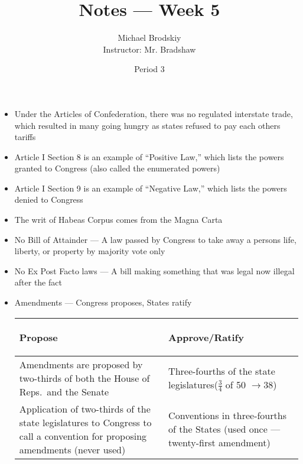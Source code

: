 \documentclass[12pt]{article}
\title{Notes — Week 5}
\date{Period 3}
\author{Michael Brodskiy\\ \small Instructor: Mr. Bradshaw}
\begin{document}
\maketitle

\begin{itemize}

  \item Under the Articles of Confederation, there was no regulated interstate trade, which resulted in many going hungry as states refused to pay each others tariffs

  \item Article I Section 8 is an example of “Positive Law,” which lists the powers granted to Congress (also called the enumerated powers)

  \item Article I Section 9 is an example of “Negative Law,” which lists the powers denied to Congress

  \item The writ of Habeas Corpus comes from the Magna Carta

  \item No Bill of Attainder — A law passed by Congress to take away a persons life, liberty, or property by majority vote only

  \item No Ex Post Facto laws — A bill making something that was legal now illegal after the fact


  \item Amendments — Congress proposes, States ratify

    \begin{center}
      \begin{tabular}{|p{}|p{}|}
        \hline
        \begin{center}Propose\end{center} & \begin{center}Approve/Ratify\end{center}\\
        \hline
        Amendments are proposed by two-thirds of both the House of Reps.\ and the Senate & Three-fourths of the state legislatures\newline ($\frac{3}{4}$ of 50 $\rightarrow 38$)\\
        \hline
        Application of two-thirds of the state legislatures to Congress to call a convention for proposing amendments (never used) & Conventions in three-fourths of the States (used once — twenty-first amendment)\\
        \hline
      \end{tabular}
    \end{center}


\end{itemize}
\end{document}
